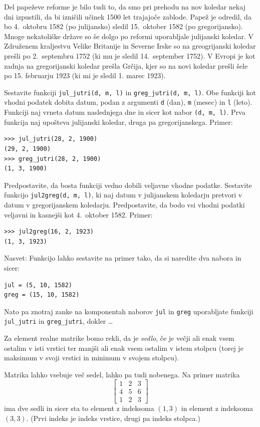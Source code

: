 \documentclass[arhiv]{../izpit}
\begin{document}
Del papeževe reforme je bilo tudi to, da smo pri prehodu na nov koledar nekaj dni izpustili, da bi
izničili učinek 1500 let trajajoče zablode. Papež je odredil, da bo 4.\ oktobru 1582 (po julijansko)
sledil 15.\ oktober 1582 (po gregorijansko). Mnoge nekatoliške države so še dolgo po reformi uporabljale
julijanski koledar. V Združenem kraljestvu Velike Britanije in Severne Irske so na greogrijanski koledar
prešli po 2.\ septembru 1752 (ki mu je sledil 14.\ september 1752). V Evropi je kot zadnja na gregorijanski koledar
prešla Grčija, kjer so na novi koledar prešli šele po 15. februarju 1923 (ki mi je sledil 1. marec 1923).

\podnaloga[20 točk]
Sestavite funkciji \texttt{jul\_jutri(d, m, l)} in \texttt{greg\_jutri(d, m, l)}. Obe funkciji kot
vhodni podatek dobita datum, podan z argumenti \texttt{d} (dan), \texttt{m} (mesec) in \texttt{l} (leto).
Funkciji naj
vrneta datum naslednjega dne in sicer kot nabor \texttt{(d, m, l)}. Prva funkcija naj upošteva
julijanski koledar, druga pa gregorijanskega. Primer:
%
\begin{verbatim}
>>> jul_jutri(28, 2, 1900)
(29, 2, 1900)
>>> greg_jutri(28, 2, 1900)
(1, 3, 1900)
\end{verbatim}
%
Predpostavite, da bosta funkciji vedno dobili veljavne vhodne podatke.
%
\podnaloga[15 točk] Sestavite funkcijo \texttt{jul2greg(d, m, l)}, ki naj datum v julijanskem koledarju pretvori v datum v
gregorijanskem koledarju. Predpostavite, da bodo vsi vhodni podatki veljavni in kasnejši kot 4.\ oktober 1582.
Primer:
%
\begin{verbatim}
>>> jul2greg(16, 2, 1923)
(1, 3, 1923)
\end{verbatim}
%
Nasvet: Funkcijo lahko sestavite na primer tako, da si naredite dva nabora in sicer:
\begin{verbatim}
jul = (5, 10, 1582)
greg = (15, 10, 1582)
\end{verbatim}
Nato pa znotraj zanke na komponentah naborov \texttt{jul} in \texttt{greg} uporabljate funkciji \texttt{jul\_jutri} in \texttt{greg\_jutri}, dokler \ldots


Za element realne matrike bomo rekli, da je \emph{sedlo}, če je večji ali enak vsem ostalim v isti vrstici ter manjši ali enak vsem ostalim v istem stolpcu (torej je maksimum v svoji vrstici in minimum v svojem stolpcu).

Matrika lahko vsebuje več sedel, lahko pa tudi nobenega. Na primer matrika
$$\begin{bmatrix} 1 & 2 & 3 \\ 4 & 5 & 6 \\ 1 & 2 & 3 \end{bmatrix}$$
ima dve sedli in sicer sta to element z indeksoma $(1, 3)$ in element z indeksoma $(3, 3)$. (Prvi indeks je indeks vrstice, drugi pa indeks stolpca.)
\end{document}
